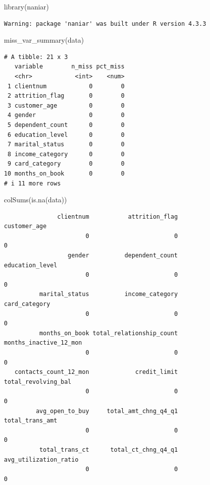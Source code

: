 \documentclass[
  letterpaper,
  DIV=11,
  numbers=noendperiod]{scrartcl}
\newenvironment{Shaded}{\begin{snugshade}}{\end{snugshade}}
\newcommand{\FunctionTok}[1]{\textcolor[rgb]{0.28,0.35,0.67}{#1}}
\newcommand{\NormalTok}[1]{\textcolor[rgb]{0.00,0.23,0.31}{#1}}
\begin{document}
\begin{Shaded}
\begin{Highlighting}[]
\FunctionTok{library}\NormalTok{(naniar)}
\end{Highlighting}
\end{Shaded}

\begin{verbatim}
Warning: package 'naniar' was built under R version 4.3.3
\end{verbatim}

\begin{Shaded}
\begin{Highlighting}[]
\FunctionTok{miss\_var\_summary}\NormalTok{(data)}
\end{Highlighting}
\end{Shaded}

\begin{verbatim}
# A tibble: 21 x 3
   variable        n_miss pct_miss
   <chr>            <int>    <num>
 1 clientnum            0        0
 2 attrition_flag       0        0
 3 customer_age         0        0
 4 gender               0        0
 5 dependent_count      0        0
 6 education_level      0        0
 7 marital_status       0        0
 8 income_category      0        0
 9 card_category        0        0
10 months_on_book       0        0
# i 11 more rows
\end{verbatim}

\begin{Shaded}
\begin{Highlighting}[]
\FunctionTok{colSums}\NormalTok{(}\FunctionTok{is.na}\NormalTok{(data))}
\end{Highlighting}
\end{Shaded}

\begin{verbatim}
               clientnum           attrition_flag             customer_age 
                       0                        0                        0 
                  gender          dependent_count          education_level 
                       0                        0                        0 
          marital_status          income_category            card_category 
                       0                        0                        0 
          months_on_book total_relationship_count   months_inactive_12_mon 
                       0                        0                        0 
   contacts_count_12_mon             credit_limit      total_revolving_bal 
                       0                        0                        0 
         avg_open_to_buy     total_amt_chng_q4_q1          total_trans_amt 
                       0                        0                        0 
          total_trans_ct      total_ct_chng_q4_q1    avg_utilization_ratio 
                       0                        0                        0 
\end{verbatim}
\end{document}

